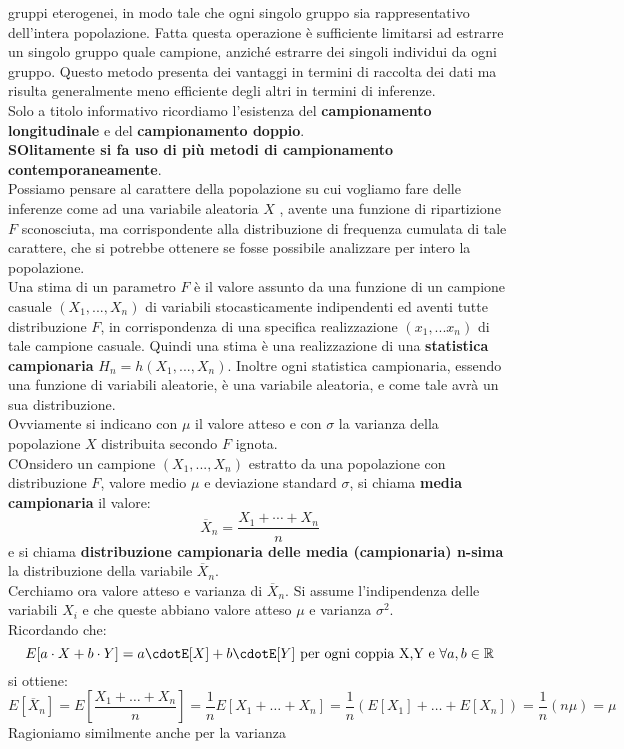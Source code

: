 \documentclass[a4paper,12pt, oneside]{book}
\newcommand{\numberset}{\mathbb}
\newcommand{\R}{\numberset{R}}
\begin{document}
gruppi eterogenei, in modo tale che ogni singolo gruppo sia rappresentativo
dell’intera popolazione. Fatta questa operazione è sufficiente limitarsi ad estrarre un singolo gruppo quale
campione, anziché estrarre dei singoli individui da ogni gruppo.
Questo metodo presenta dei vantaggi in termini di raccolta dei dati ma risulta
generalmente meno efficiente degli altri in termini di inferenze.\\
Solo a titolo informativo ricordiamo l'esistenza del \textbf{campionamento longitudinale} e del \textbf{campionamento doppio}. \\
\textbf{SOlitamente si fa uso di più metodi di campionamento contemporaneamente}.\\
Possiamo pensare al carattere della popolazione su cui vogliamo fare delle inferenze come ad una variabile aleatoria $X$ ,
avente una funzione di ripartizione $F$ sconosciuta, ma corrispondente alla
distribuzione di frequenza cumulata di tale carattere, che si potrebbe ottenere se
fosse possibile analizzare per intero la popolazione.\\
Una stima di un parametro $F$ è il valore assunto da una funzione di un campione
casuale $(X_1,...,X_n)$ di variabili stocasticamente indipendenti ed aventi tutte distribuzione $F$, in corrispondenza di una specifica realizzazione $(x_1,...x_n)$ di tale campione casuale. Quindi una stima è una realizzazione di una \textbf{statistica campionaria} $H_n=h(X_1,...,X_n)$. Inoltre ogni statistica campionaria, essendo una funzione di variabili aleatorie, è una
variabile aleatoria, e come tale avrà un sua distribuzione.\\
Ovviamente si indicano con $\mu$ il valore atteso e con $\sigma$ la varianza della popolazione $X$ distribuita secondo $F$ ignota.\\
COnsidero un campione $(X_1,...,X_n)$ estratto da una popolazione con distribuzione $F$, valore medio $\mu$ e deviazione standard $\sigma$, si chiama \textbf{media campionaria}
il valore:
\[\overline{X}_n=\frac{X_1+\cdots+X_n}{n}\]
e si chiama \textbf{distribuzione campionaria delle media (campionaria) n-sima} la distribuzione della variabile $\overline{X}_n$.\\
Cerchiamo ora valore atteso e varianza di $\overline{X}_n$. Si assume l'indipendenza delle variabili $X_i$ e che queste abbiano valore atteso $\mu$ e varianza $\sigma^2$.\\
Ricordando che:
\[E[a\cdot X+b\cdot Y]=a\cdotE[X]+b\cdotE[Y]\mbox{ per ogni coppia X,Y e }\forall a,b\in \R\]
si ottiene:
\[E\left[\overline{X}_{n}\right]=E\left[\frac{X_{1}+\ldots+X_{n}}{n}\right]=\frac{1}{n} E\left[X_{1}+\ldots+X_{n}\right]=\frac{1}{n}\left(E\left[X_{1}\right]+\ldots+E\left[X_{n}\right]\right)=\frac{1}{n}(n \mu)=\mu\]
Ragioniamo similmente anche per la varianza
\end{document}
